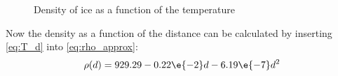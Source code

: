 \begin{figure}[htb]
	\centering
	\caption{Density of ice as a function of the temperature}
\end{figure}

\noindent
Now the density as a function of the distance can be calculated by inserting \eqref{eq:T_d} into \eqref{eq:rho_approx}:
\begin{equation}\label{eq:rho_approx_d}
	\rho(d) = 929.29 - 0.22 \e{-2} d - 6.19 \e{-7} d^2
\end{equation}

